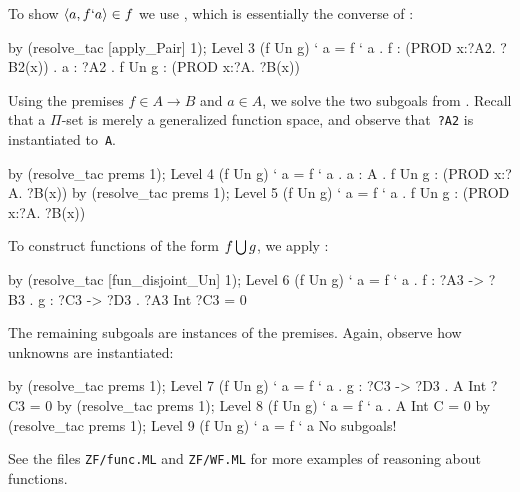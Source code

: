 To show $\langle a,f`a\rangle\in f$ we use , which is
essentially the converse of :
\begin{ttbox}
by (resolve_tac [apply_Pair] 1);
{\out Level 3}
{\out (f Un g) ` a = f ` a}
{. f : (PROD x:?A2. ?B2(x))}
{. a : ?A2}
{. f Un g : (PROD x:?A. ?B(x))}
\end{ttbox}
Using the premises $f\in A\to B$ and $a\in A$, we solve the two subgoals
from .  Recall that a $\Pi$-set is merely a generalized
function space, and observe that~{\tt?A2} is instantiated to~{\tt A}.
\begin{ttbox}
by (resolve_tac prems 1);
{\out Level 4}
{\out (f Un g) ` a = f ` a}
{. a : A}
{. f Un g : (PROD x:?A. ?B(x))}
by (resolve_tac prems 1);
{\out Level 5}
{\out (f Un g) ` a = f ` a}
{. f Un g : (PROD x:?A. ?B(x))}
\end{ttbox}
To construct functions of the form $f\bigcup g$, we apply
:
\begin{ttbox}
by (resolve_tac [fun_disjoint_Un] 1);
{\out Level 6}
{\out (f Un g) ` a = f ` a}
{. f : ?A3 -> ?B3}
{. g : ?C3 -> ?D3}
{. ?A3 Int ?C3 = 0}
\end{ttbox}
The remaining subgoals are instances of the premises.  Again, observe how
unknowns are instantiated:
\begin{ttbox}
by (resolve_tac prems 1);
{\out Level 7}
{\out (f Un g) ` a = f ` a}
{. g : ?C3 -> ?D3}
{. A Int ?C3 = 0}
by (resolve_tac prems 1);
{\out Level 8}
{\out (f Un g) ` a = f ` a}
{. A Int C = 0}
by (resolve_tac prems 1);
{\out Level 9}
{\out (f Un g) ` a = f ` a}
{\out No subgoals!}
\end{ttbox}
See the files {\tt ZF/func.ML} and {\tt ZF/WF.ML} for more
examples of reasoning about functions.

